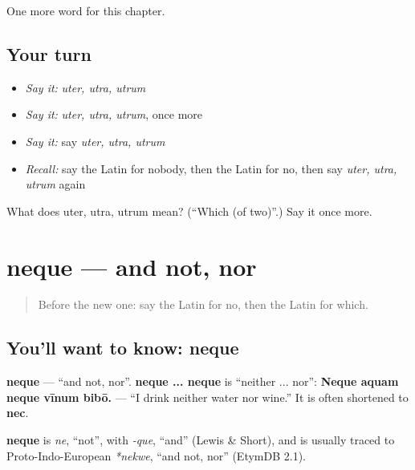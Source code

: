 \begin{grammarlens}[title={What you've built}]
One more word for this chapter.
\end{grammarlens}

\subsection*{Your turn}
\begin{itemize}
\raggedright
  \item \emph{Say it:} \emph{uter, utra, utrum}
  \item \emph{Say it:} \emph{uter, utra, utrum}, once more
  \item \emph{Say it:} say \emph{uter, utra, utrum}
  \item \emph{Recall:} say the Latin for nobody, then the Latin for no, then say \emph{uter, utra, utrum} again
\end{itemize}

\begin{tcolorbox}[breakable,colback=teal!4,colframe=teal!35!black,title={Before you move on}]
What does uter, utra, utrum mean? (\textquotedblleft{}Which (of two)\textquotedblright{}.) Say it once more.
\end{tcolorbox}
\section[neque]{neque — and not, nor}

\label{lesson:LA-C161-neque}



\begin{quote}
Before the new one: say the Latin for no, then the Latin for which.
\end{quote}

\subsection*{You'll want to know: neque}
\textbf{neque} — \textquotedblleft{}and not, nor\textquotedblright{}. \textbf{neque ... neque} is \textquotedblleft{}neither ... nor\textquotedblright{}: \textbf{Neque aquam neque vīnum bibō.} — \textquotedblleft{}I drink neither water nor wine.\textquotedblright{} It is often shortened to \textbf{nec}.

\begin{cousinweb}
\textbf{neque} is \emph{ne}, \textquotedblleft{}not\textquotedblright{}, with \emph{-que}, \textquotedblleft{}and\textquotedblright{} (Lewis \& Short), and is usually traced to Proto-Indo-European \emph{*nekwe}, \textquotedblleft{}and not, nor\textquotedblright{} (EtymDB 2.1).
\end{cousinweb}


